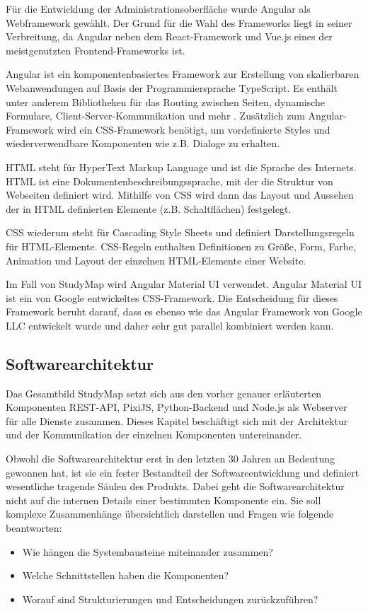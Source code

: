 Für die Entwicklung der Administrationsoberfläche wurde Angular als Webframework gewählt. Der Grund für die Wahl des Frameworks liegt in seiner Verbreitung, da Angular neben dem React-Framework und Vue.js eines der meistgenutzten Frontend-Frameworks ist. \parencite{greif_state_2022}

Angular ist ein komponentenbasiertes Framework zur Erstellung von skalierbaren Webanwendungen auf Basis der Programmiersprache TypeScript. Es enthält unter anderem Bibliotheken für das Routing zwischen Seiten, dynamische Formulare, Client-Server-Kommunikation und mehr \parencite{google_inc_angular_2023}. Zusätzlich zum Angular-Framework wird ein CSS-Framework benötigt, um vordefinierte Styles und wiederverwendbare Komponenten wie z.B. Dialoge zu erhalten.

HTML steht für HyperText Markup Language und ist die Sprache des Internets. HTML ist eine Dokumentenbeschreibungssprache, mit der die Struktur von Webseiten definiert wird. Mithilfe von CSS wird dann das Layout und Aussehen der in HTML definierten Elemente (z.B. Schaltflächen) festgelegt. \parencite{mozilla_corporation_html_2023}

CSS wiederum steht für Cascading Style Sheets und definiert Darstellungsregeln für HTML-Elemente. CSS-Regeln enthalten Definitionen zu Größe, Form, Farbe, Animation und Layout der einzelnen HTML-Elemente einer Website. \parencite{mozilla_corporation_what_2024}

Im Fall von StudyMap wird Angular Material UI verwendet. Angular Material UI ist ein von Google entwickeltes CSS-Framework. Die Entscheidung für dieses Framework beruht darauf, dass es ebenso wie das Angular Framework von Google LLC entwickelt wurde und daher sehr gut parallel kombiniert werden kann. \parencite{google_llc_angular_2024}


\newpage
\subsection{Softwarearchitektur}
Das Gesamtbild StudyMap setzt sich aus den vorher genauer erläuterten Komponenten REST-API, PixiJS, Python-Backend und Node.js als Webserver für alle Dienste zusammen. Dieses Kapitel beschäftigt sich mit der Architektur und der Kommunikation der einzelnen Komponenten untereinander.

Obwohl die Softwarearchitektur erst in den letzten 30 Jahren an Bedeutung gewonnen hat, ist sie ein fester Bestandteil der Softwareentwicklung und definiert wesentliche tragende Säulen des Produkts. Dabei geht die Softwarearchitektur nicht auf die internen Details einer bestimmten Komponente ein. \parencite{vogel_einleitung_2009} Sie soll komplexe Zusammenhänge übersichtlich darstellen und Fragen wie folgende beantworten:
\begin{itemize}
    \item Wie hängen die Systembausteine miteinander zusammen?
    \item Welche Schnittstellen haben die Komponenten?
    \item Worauf sind Strukturierungen und Entscheidungen zurückzuführen?
\end{itemize}


